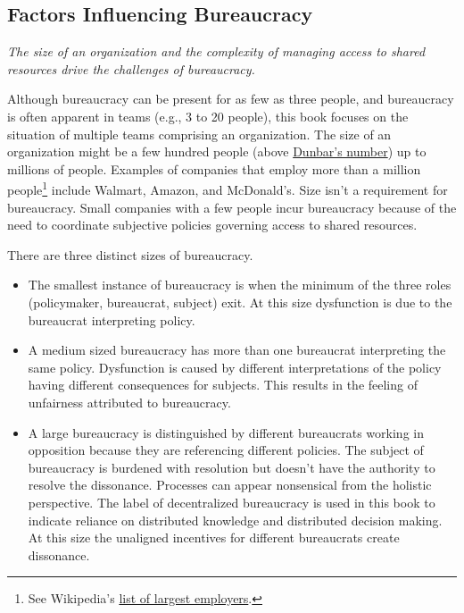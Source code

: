 \subsection*{Factors Influencing Bureaucracy}

\textit{The size of an organization and the complexity of managing access to shared resources drive the challenges of bureaucracy.}

Although bureaucracy can be present for as few as three people, and bureaucracy is often apparent in teams (e.g., 3 to 20 people), this book focuses on the situation of multiple teams comprising an organization. The size of an organization might be a few hundred people (above \href{https://en.wikipedia.org/wiki/Dunbar\%27s_number}{Dunbar's number})\iftoggle{WPinmargin}{\marginpar{$>$Wikipedia: Dunbar's number}}{}
 up to millions of people. 
Examples of companies that employ more than a million people\footnote{See Wikipedia's \href{https://en.wikipedia.org/wiki/List_of_largest_employers}{list of largest employers}.
} include Walmart, Amazon, and McDonald's. Size isn't a requirement for bureaucracy. Small companies with a few people incur bureaucracy because of the need to coordinate subjective policies governing access to shared resources. 


There are three distinct sizes of bureaucracy.
\begin{itemize}
\item The smallest instance of bureaucracy is when the minimum of the three roles (policymaker, bureaucrat, subject) exit. At this size dysfunction is due to the bureaucrat interpreting policy.
\item A medium sized bureaucracy has more than one bureaucrat interpreting the same policy. Dysfunction is caused by different interpretations of the policy having different consequences for subjects. This results in the feeling of unfairness attributed to bureaucracy.
\item A large bureaucracy is distinguished by different bureaucrats working in opposition because they are referencing different policies. The subject of bureaucracy is burdened with resolution but doesn't have the authority to resolve the dissonance. Processes can appear nonsensical from the holistic perspective.
The label of \gls{decentralized bureaucracy} is used in this book to indicate reliance on distributed knowledge and distributed decision making. At this size the unaligned incentives for different bureaucrats create dissonance.
\end{itemize}

